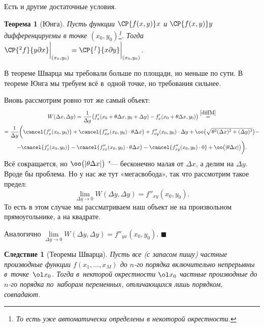 \documentclass[a4paper,10pt,twoside]{article}
\newtheorem{The}{Теорема}[section]
\newtheorem{Sl}{Следствие}[section]
\newenvironment{Proof}
       {\par\noindent{\textbf{Доказательство.}}}
       {\hfill$\scriptstyle\blacksquare$}
\begin{document}
	 Есть и другие достаточные условия.
	 \begin{The}[Юнга]\label{Ung}
	 Пусть функции $\CP{f(x,y)}x$ и $\CP{f(x,y)}y$ дифференцируемы в точке $(x_0,y_0)$\footnote{То есть уже автоматически определены в некоторой окрестности.}.
	 Тогда $\CP{^2f}{y\partial x}\bigg|_{(x_0,y_0)} = \CP{^f}{x\partial y}\bigg|_{(x_0,y_0)}$.
	 \end{The}
	 В теореме Шварца мы требовали больше по площади, но меньше по сути. В теореме Юнга мы требуем всё в~одной точке, но требования сильнее.
	 \begin{Proof}
	 Вновь рассмотрим ровно тот же самый объект:
	 \begin{multline*}W(\Delta x,\Delta y) = \frac1{\Delta y}\big(f'_x(x_0+\theta\Delta x, y_0+\Delta y) - f'_x(x_0+\theta\Delta x,y_0)\big) \overset{\ref{diffM}}{=} \\
	 =\frac1{\Delta y}\bigg(\cancel{f'_x(x_0,y_0)} + \cancel{f''_{xx}(x_0,y_0)\cdot\theta\Delta x} + f''_{xy}(x_0,y_0)\cdot \Delta y +\oo\big(\sqrt{\theta^2(\Delta x)^2 + (\Delta y)^2}\big)
	 - \\ - \cancel{f'_x(x_0,y_0)} - \cancel{f''_{xx}(x_0,y_0)\cdot \theta\Delta x} - \cancel{f''_{xy}(x_0,y_0)\cdot 0} + \oo\big(|\theta\Delta x|\big)\bigg).
	 \end{multline*}
	 Всё сокращается, но $\oo\big(|\theta\Delta x|\big)$ "--- бесконечно малая от $\Delta x$, а делим на $\Delta y$. Вроде бы проблема. Но у нас же тут «мегасвобода», так что рассмотрим такое предел:
	 \[\lim\limits_{\Delta y\to 0}W(\Delta y,\Delta y) = f''_{xy}(x_0,y_0).\]
	 То есть в этом случае мы рассматриваем наш объект не на произвольном прямоугольнике, а на квадрате.
	 
	 Аналогично $\lim\limits_{\Delta y\to 0}W(\Delta y,\Delta y) = f''_{yx}(x_0,y_0)$.
	 \end{Proof}
	 \begin{Sl}[Теоремы Шварца]
	 Пусть все (с запасом пишу) частные производные функции $f(x_1,\ldots,x_M)$ до $n$-го порядка включительно непрерывны в~точке~$\ol x_0$.
	 Тогда в~некторой окрестности $\ol x_0$ частные производные до $n$-го порядка по~наборам переменных, отличающихся лишь порядком, совпадают. 
	 \end{Sl}
\end{document}

